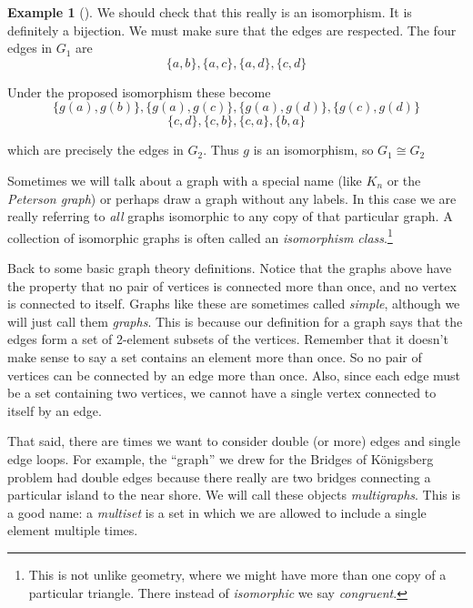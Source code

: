 \documentclass[10pt,]{book}
\theoremstyle{plain}
\theoremstyle{definition}
\newtheorem{example}[theorem]{Example}
\theoremstyle{definition}
\theoremstyle{definition}
\numberwithin{equation}{chapter}
\begin{document}
\begin{example}[]
We should check that this really is an isomorphism. It is definitely a bijection. We must make sure that the edges are respected. The four edges in \(G_1\) are
\begin{equation*}
  \{a,b\}, \{a,c\}, \{a,d\}, \{c,d\}
\end{equation*}
%
\par

Under the proposed isomorphism these become
\begin{equation*}
  \{g(a), g(b)\}, \{g(a), g(c)\}, \{g(a), g(d)\}, \{g(c), g(d)\}
\end{equation*}
%
\begin{equation*}
  \{c,d\}, \{c,b\}, \{c,a\}, \{b,a\}
\end{equation*}\par

which are precisely the edges in \(G_2\). Thus \(g\) is an isomorphism, so \(G_1 \cong G_2\)
%
\end{example}
\par

Sometimes we will talk about a graph with a special name (like \(K_n\) or the \emph{Peterson graph}) or perhaps draw a graph without any labels. In this case we are really referring to \emph{all} graphs isomorphic to any copy of that particular graph. A collection of isomorphic graphs is often called an \emph{isomorphism class}.\footnote{This is not unlike geometry, where we might have more than one copy of a particular triangle.  There instead of \emph{isomorphic} we say \emph{congruent}.\label{fn-12}}
%
\par

Back to some basic graph theory definitions. Notice that the graphs above have the property that no pair of vertices is connected more than once, and no vertex is connected to itself. Graphs like these are sometimes called \emph{simple}, although we will just call them \emph{graphs}. This is because our definition for a graph says that the edges form a set of 2-element subsets of the vertices. Remember that it doesn't make sense to say a set contains an element more than once. So no pair of vertices can be connected by an edge more than once. Also, since each edge must be a set containing two vertices, we cannot have a single vertex connected to itself by an edge.
%
\par

That said, there are times we want to consider double (or more) edges and single edge loops. For example, the ``graph'' we drew for the Bridges of Königsberg problem had double edges because there really are two bridges connecting a particular island to the near shore. We will call these objects \emph{multigraphs}. This is a good name: a \emph{multiset} is a set in which we are allowed to include a single element multiple times.
%
\par
\end{document}

